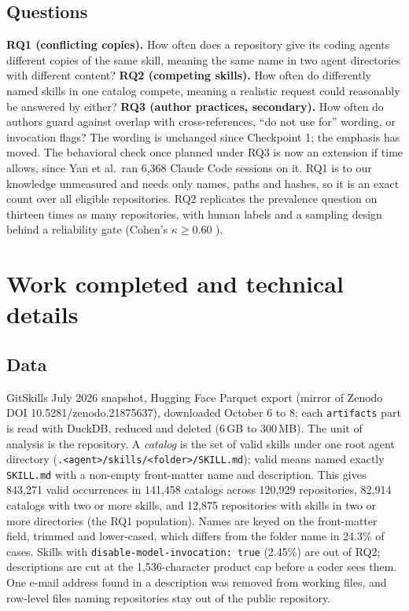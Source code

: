 \documentclass[10pt]{article}
\begin{document}
\subsection{Questions}
\textbf{RQ1 (conflicting copies).} How often does a repository give its coding agents different copies of the same
skill, meaning the same name in two agent directories with different content?
\textbf{RQ2 (competing skills).} How often do differently named skills in one catalog compete, meaning a realistic
request could reasonably be answered by either?
\textbf{RQ3 (author practices, secondary).} How often do authors guard against overlap with cross-references, ``do not
use for'' wording, or invocation flags?
The wording is unchanged since Checkpoint 1; the emphasis has moved. The behavioral check once planned under RQ3 is now
an extension if time allows, since Yan et al.\ ran 6,368 Claude Code sessions on it. RQ1 is to our knowledge unmeasured
and needs only names, paths and hashes, so it is an exact count over all eligible repositories. RQ2 replicates the
prevalence question on thirteen times as many repositories, with human labels and a sampling design behind a
reliability gate (Cohen's $\kappa \geq 0.60$ \cite{cohen1960kappa,landis1977kappa}).

\section{Work completed and technical details}

\subsection{Data}
GitSkills July 2026 snapshot, Hugging Face Parquet export (mirror of Zenodo DOI 10.5281/zenodo.21875637), downloaded
October 6 to 8; each \texttt{artifacts} part is read with DuckDB, reduced and deleted (6\,GB to 300\,MB). The unit of
analysis is the repository. A \emph{catalog} is the set of valid skills under one root agent directory
(\texttt{.<agent>/skills/<folder>/SKILL.md}); valid means named exactly \texttt{SKILL.md} with a non-empty front-matter
name and description. This gives 843,271 valid occurrences in 141,458 catalogs across 120,929 repositories, 82,914
catalogs with two or more skills, and 12,875 repositories with skills in two or more directories (the RQ1 population).
Names are keyed on the front-matter field, trimmed and lower-cased, which differs from the folder name in 24.3\% of cases.
Skills with \texttt{disable-model-invocation: true} (2.45\%) are out of RQ2; descriptions are cut at the 1,536-character
product cap before a coder sees them. One e-mail address found in a description was removed from working files, and
row-level files naming repositories stay out of the public repository.
\end{document}
